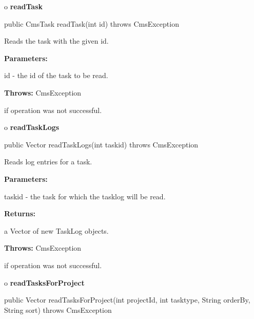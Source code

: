 o {\bf readTask} 

\begin{PRE}
 public CmsTask readTask(int id) throws CmsException
\end{PRE}

\begin{description}
\htmlDD Reads the task with the given id. 

\begin{description}
\item {\bf Parameters:}  

id - the id of the task to be read.  
\item {\bf Throws:} CmsException  

if operation was not successful.  
\end{description}

\end{description}

o {\bf readTaskLogs} 

\begin{PRE}
 public Vector readTaskLogs(int taskid) throws CmsException
\end{PRE}

\begin{description}
\htmlDD Reads log entries for a task. 

\begin{description}
\item {\bf Parameters:}  

taskid - the task for which the tasklog will be read.  
\item {\bf Returns:}  

a Vector of new TaskLog objects.  
\item {\bf Throws:} CmsException  

if operation was not successful.  
\end{description}

\end{description}

o {\bf readTasksForProject} 

\begin{PRE}
 public Vector readTasksForProject(int projectId,
                                   int tasktype,
                                   String orderBy,
                                   String sort) throws CmsException
\end{PRE}

